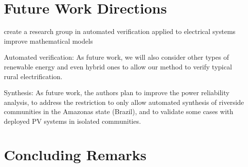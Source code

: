\section{Future Work Directions}
create a research group in automated verification applied to electrical systems
improve mathematical models

Automated verification: As future work, we will also consider other types of renewable energy and even hybrid ones to allow our method to verify typical rural electrification.

Synthesis: As future work, the authors plan to improve the power reliability analysis, 
to address the restriction to only allow automated synthesis of 
riverside communities in the Amazonas state (Brazil), and to 
validate some cases with deployed PV systems in isolated communities.

\section{Concluding Remarks}